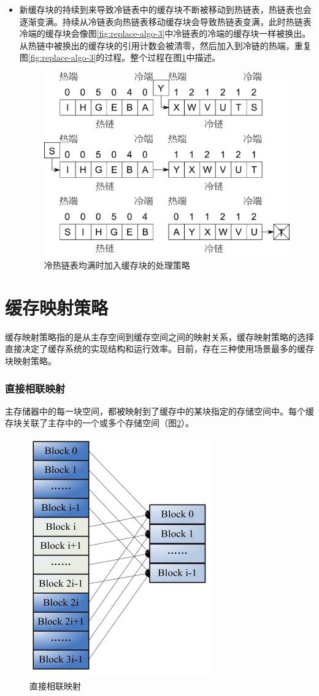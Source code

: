 \begin{itemize}
\item
新缓存块的持续到来导致冷链表中的缓存块不断被移动到热链表，热链表也会逐渐变满。持续从冷链表向热链表移动缓存块会导致热链表变满，此时热链表冷端的缓存块会像图\ref{fig:replace-algo-3}中冷链表的冷端的缓存块一样被换出。从热链中被换出的缓存块的引用计数会被清零，然后加入到冷链的热端，重复图\ref{fig:replace-algo-3}的过程。整个过程在图\ref{fig:replace-algo-4}中描述。
\begin{figure}[H]
\centering
\includegraphics[width=0.7\linewidth]{./graph/replace-algo-4}
\caption{冷热链表均满时加入缓存块的处理策略}
\label{fig:replace-algo-4}
\end{figure}
\end{itemize}

\section{缓存映射策略}
\label{sec:cache_mapping}

缓存映射策略指的是从主存空间到缓存空间之间的映射关系，缓存映射策略的选择直接决定了缓存系统的实现结构和运行效率。目前，存在三种使用场景最多的缓存块映射策略\cite{cachemap2013}。

\subsubsection{直接相联映射}

主存储器中的每一块空间，都被映射到了缓存中的某块指定的存储空间中。每个缓存块关联了主存中的一个或多个存储空间（图\ref{fig:cache-map-1}）。

\begin{figure}[H]
\centering
\includegraphics[width=0.3\linewidth]{./graph/cache-map-1}
\caption{直接相联映射}
\label{fig:cache-map-1}
\end{figure}

